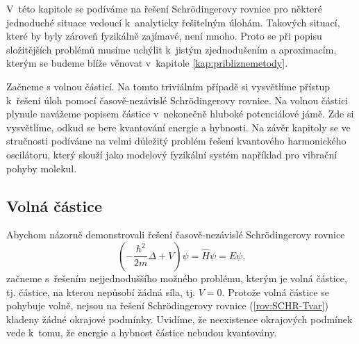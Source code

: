 V~této kapitole se podíváme na řešení Schrödingerovy rovnice pro některé jednoduché situace vedoucí k~analyticky řešitelným úlohám. Takových situací, které by byly zároveň fyzikálně zajímavé, není mnoho. Proto se při popisu složitějších problémů musíme uchýlit k~jistým zjednodušením a aproximacím, kterým se budeme blíže věnovat v~kapitole \ref{kap:pribliznemetody}.

Začneme s volnou částicí. Na tomto triviálním případě si vysvětlíme přístup k~řešení úloh pomocí časově-nezávislé Schrödingerovy rovnice. Na volnou částici plynule navážeme popisem částice v~nekonečně hluboké potenciálové jámě. Zde si vysvětlíme, odkud se bere kvantování energie a hybnosti. Na závěr kapitoly se ve stručnosti podíváme na velmi důležitý problém řešení kvantového harmonického oscilátoru, který slouží jako modelový fyzikální systém například pro vibrační pohyby molekul.

\subsection{Volná částice}
\label{kap:VolnaCastice}

Abychom názorně demonstrovali řešení časově-nezávislé Schrödingerovy rovnice
\begin{equation}
(- \frac{\hbar^2}{2m} \Delta + V) \psi = \hat{H} \psi = E \psi \mbox{,}
\label{rov:SCHR-Tvar}
\end{equation}
začneme s~řešením nejjednoduššího možného problému, kterým je volná částice, tj. částice, na kterou nepůsobí žádná síla, tj. $V = 0$. Protože volná částice se pohybuje volně, nejsou na řešení Schrödingerovy rovnice (\ref{rov:SCHR-Tvar}) kladeny žádné okrajové podmínky. Uvidíme, že neexistence okrajových podmínek vede k~tomu, že energie a hybnost částice nebudou kvantovány.

